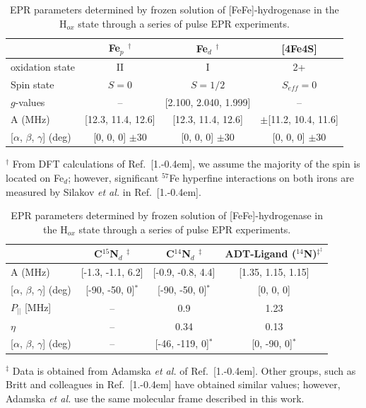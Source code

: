 \begin{table}[hb]
\caption[EPR parameters determined for FeFe-hydrogenase in Hox state.]{EPR parameters determined by frozen solution of [FeFe]-hydrogenase in the H$_{ox}$ state through a series of pulse EPR experiments.}
\centering
\begin{tabular}{l|c|c||c}
 & Fe$_p$ $^\dagger$ & Fe$_d$ $^\dagger$ & {[}4Fe4S{]} \\ \hline \hline
oxidation state & II & I & 2+ \\
Spin state & $S=0$ & $S=1/2$ & $S_{eff}=0$ \\
$g$-values & -- & {[}2.100, 2.040, 1.999{]} & -- \\
A (MHz) & {[}12.3, 11.4, 12.6{]} & {[}12.3, 11.4, 12.6{]} & $\pm${[}11.2, 10.4, 11.6{]} \\
{[}$\alpha$, $\beta$, $\gamma${]} (deg) & {[}0, 0, 0{]} $\pm$30 & {[}0, 0, 0{]} $\pm$30 & {[}0, 0, 0{]} $\pm$30
\end{tabular}
\begin{flushleft}\footnotesize{$^\dagger$ From DFT calculations of Ref.~[1.\kern-0.4em], we assume the majority of the spin is located on Fe$_d$; however, significant $^{57}$Fe hyperfine interactions on both irons are measured by Silakov {\em et al.} in Ref.~[1.\kern-0.4em].} \end{flushleft}

\begin{tabular}{l|c|c|c}
& C$^{15}$N$_d$ $^\ddagger$ & C$^{14}$N$_d$ $^\ddagger$ & ADT-Ligand ($^{14}$N)$^{\ddagger^\ddagger}$\\ \hline \hline
A (MHz) &  {[}-1.3, -1.1, 6.2{]} & {[}-0.9, -0.8, 4.4{]} & {[}1.35, 1.15, 1.15{]}\\
{[}$\alpha$, $\beta$, $\gamma${]} (deg) & {[}-90, -50, 0{]}$^\ast$ & {[}-90, -50, 0{]}$^\ast$ & {[}0, 0, 0{]}\\
$P_{||}$ {[}MHz{]} &  -- & 0.9 & 1.23\\ 
$\eta$ & -- & 0.34 & 0.13 \\
{[}$\alpha$, $\beta$, $\gamma${]} (deg) & -- & {[}-46, -119, 0{]}$^\ast$ & {[}0, -90, 0{]}$^\ast$
\end{tabular}
\begin{flushleft}\footnotesize{$^\ddagger$ Data is obtained from Adamska {\em et al.} of Ref.~[1.\kern-0.4em]. Other groups, such as Britt and colleagues in Ref.~[1.\kern-0.4em] have obtained similar values; however, Adamska {\em et al.} use the same molecular frame described in this work. 

}
\end{flushleft}
\end{table}
